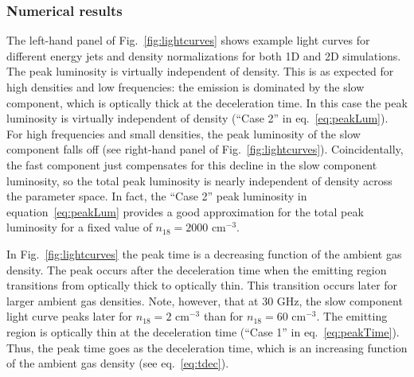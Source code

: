 \documentclass[usenatbib,fleqn]{mnras}
\begin{document}
\subsubsection{Numerical results}
The left-hand panel of Fig.~\ref{fig:lightcurves} shows example light
curves for different energy jets and density normalizations for both
1D and 2D simulations. The peak luminosity is virtually independent of
density.  This is as expected for high densities and low frequencies:
the emission is dominated by the slow component, which is optically
thick at the deceleration time. In this case the peak luminosity is
virtually independent of density (``Case 2'' in
eq.~\ref{eq:peakLum}). For high frequencies and small densities, the
peak luminosity of the slow component falls off (see right-hand panel
of Fig.~\ref{fig:lightcurves}). Coincidentally, the fast component
just compensates for this decline in the slow component luminosity, so
the total peak luminosity is nearly independent of density across the
parameter space. In fact, the ``Case 2'' peak luminosity in
equation~\ref{eq:peakLum} provides a good approximation for the total
peak luminosity for a fixed value of $n_{18}=2000$ cm$^{-3}$.

In Fig.~\ref{fig:lightcurves} the peak time is a decreasing function of
the ambient gas density. The peak occurs after the deceleration time
when the emitting region transitions from optically thick to optically
thin. This transition occurs later for larger ambient gas
densities. Note, however, that at 30 GHz, the slow component light
curve peaks later for $n_{18}=2$ cm$^{-3}$ than for $n_{18}=60$
cm$^{-3}$. The emitting region is optically thin at the deceleration
time (``Case 1'' in eq.~\ref{eq:peakTime}). Thus, the peak time goes
as the deceleration time, which is an increasing function of the
ambient gas density (see eq.~\ref{eq:tdec}).
\end{document}
